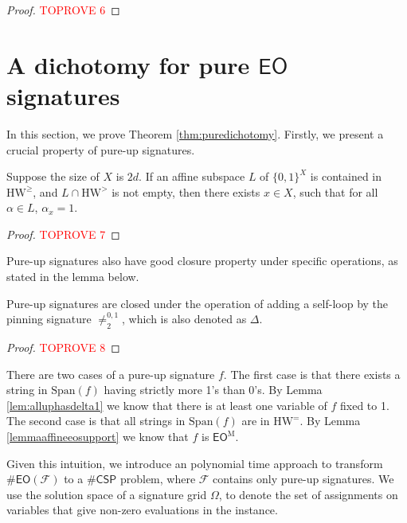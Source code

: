 \documentclass[a4paper,UKenglish,cleveref, autoref, thm-restate]{lipics-v2021}
\newcommand{\bi}[2]{\neq_2^{#1,#2}}
\newcommand{\eo}[0]{\textsf{EO}}
\newcommand{\csp}[0]{\textsf{CSP}}
\newcommand{\eoe}[0]{\text{HW}^=}
\newcommand{\eog}[0]{\text{HW}^\geq}
\newcommand{\hw}[1]{\text{HW}^{#1}}
\newcommand{\pin}[0]{\Delta}
\newcommand{\eom}[1][\text{M}]{\textsf{EO}^{#1}}
\begin{document}
\begin{proof}\textcolor{red}{TOPROVE 6}\end{proof}

\section{A dichotomy for pure $\eo$ signatures} \label{section:allup}


In this section, we prove Theorem \ref{thm:puredichotomy}. Firstly, we present a crucial property of pure-up signatures.

\begin{lemma} \label{lem:alluphasdelta1}
Suppose the size of $X$ is $2d$. If an affine subspace $L$ of $\{0,1\}^X$ is contained in $\eog$, and $L \cap \hw{>}$ is not empty, then there exists $x \in X$, such that for all $\alpha \in L$, $\alpha_x=1$. 
\end{lemma}

\begin{proof}\textcolor{red}{TOPROVE 7}\end{proof}

 

Pure-up signatures also have good closure property under specific operations, as stated in the lemma below.

\begin{lemma}  \label{lem: allup closed under pin}
    Pure-up signatures are closed under the operation of adding a self-loop by the pinning signature $\bi{0}{1}$, which is also denoted as $\pin$. 
\end{lemma}
\begin{proof}\textcolor{red}{TOPROVE 8}\end{proof}

There are two cases of a pure-up signature $f$. The first case is that there exists a string in $\text{Span}(f)$ having strictly more 1's than 0's. By Lemma \ref{lem:alluphasdelta1} we know that there is at least one variable of $f$ fixed to 1. The second case is that all strings in $\text{Span}(f)$ are in $\eoe$. By Lemma \ref{lemmaaffineeosupport} we know that $f$ is $\eom$. 

Given this intuition, we introduce an polynomial time approach to transform $\#\eo(\mathcal{F})$ to a $\#\csp$ problem, where $\mathcal{F}$ contains only pure-up signatures. We use the solution space of a signature grid $\Omega$, to denote the set of assignments on variables that give non-zero evaluations in the instance.
\end{document}
